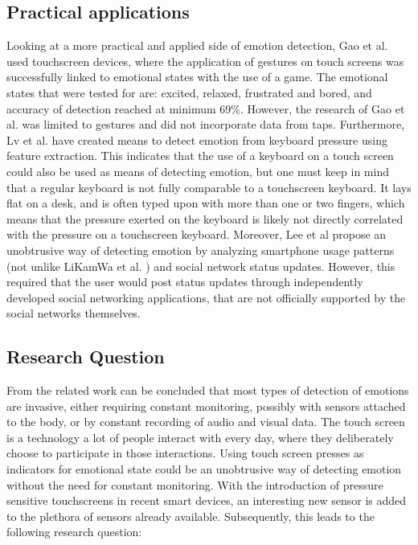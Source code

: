 \documentclass{sigchi}
\begin{document}
\subsection{Practical applications} %
\label{sub:practical_applications}
Looking at a more practical and applied side of emotion detection, Gao et al. \cite{Gao2012} used touchscreen devices, where the application of gestures on touch screens was successfully linked to emotional states with the use of a game. The emotional states that were tested for are: excited, relaxed, frustrated and bored, and accuracy of detection reached at minimum 69\%. However, the research of Gao et al. was limited to gestures and did not incorporate data from taps. Furthermore, Lv et al. \cite{H.R.LvZ.L.LinW.J.Yin2008} have created means to detect emotion from keyboard pressure using feature extraction. This indicates that the use of a keyboard on a touch screen could also be used as means of detecting emotion, but one must keep in mind that a regular keyboard is not fully comparable to a touchscreen keyboard. It lays flat on a desk, and is often typed upon with more than one or two fingers, which means that the pressure exerted on the keyboard is likely not directly correlated with the pressure on a touchscreen keyboard. Moreover, Lee et al \cite{Lee2012} propose an unobtrusive way of detecting emotion by analyzing smartphone usage patterns (not unlike LiKamWa et al. \cite{Likamwa2013}) and social network status updates. However, this required that the user would post status updates through independently developed social networking applications, that are not officially supported by the social networks themselves.


\subsection{Research Question}
From the related work can be concluded that most types of detection of emotions are invasive, either requiring constant monitoring, possibly with sensors attached to the body, or by constant recording of audio and visual data. The touch screen is a technology a lot of people interact with every day, where they deliberately choose to participate in those interactions. Using touch screen presses as indicators for emotional state could be an unobtrusive way of detecting emotion without the need for constant monitoring. With the introduction of pressure sensitive touchscreens in recent smart devices, an interesting new sensor is added to the plethora of sensors already available. Subsequently, this leads to the following research question:\\
\end{document}
